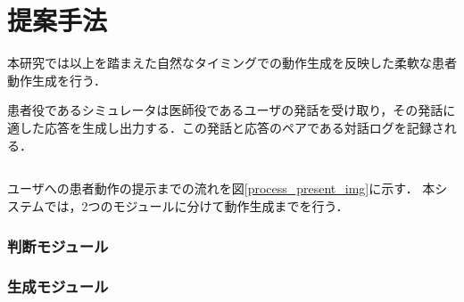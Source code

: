 \chapter{提案手法} \label{concept}
本研究では以上を踏まえた自然なタイミングでの動作生成を反映した柔軟な患者動作生成を行う．
\par
患者役であるシミュレータは医師役であるユーザの発話を受け取り，その発話に適した応答を生成し出力する．この発話と応答のペアである対話ログを記録される．

\section{}
\begin{figure}[p]
\end{figure}

\par 
ユーザへの患者動作の提示までの流れを図\ref{process_present_img}に示す．
本システムでは，2つのモジュールに分けて動作生成までを行う．

\subsection{判断モジュール}\label{decision_module}

\subsection{生成モジュール}\label{generate_module}




